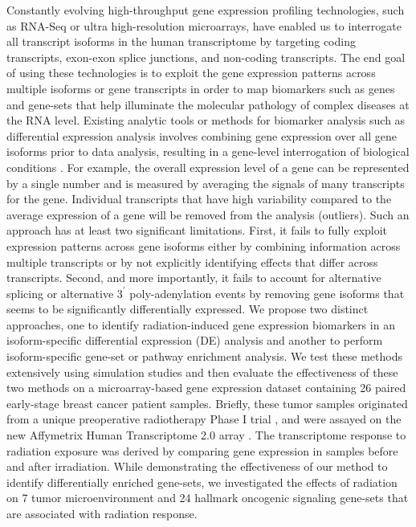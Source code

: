 \documentclass[hidelinks,11pt]{article}
\begin{document}
Constantly evolving high-throughput gene expression profiling technologies, such as RNA-Seq or ultra high-resolution microarrays, have enabled us to interrogate all transcript isoforms in the human transcriptome by targeting coding transcripts, exon-exon splice junctions, and non-coding transcripts. The end goal of using these technologies is to exploit the gene expression patterns across multiple isoforms or gene transcripts in order to map biomarkers such as genes and gene-sets that help illuminate the molecular pathology of complex diseases at the RNA level. Existing analytic tools or methods for biomarker analysis such as differential expression analysis involves combining gene expression over all gene isoforms prior to data analysis, resulting in a gene-level interrogation of biological conditions \cite{collapserows,iri,gsa,gsea,gsva,seqgsea}. For example, the overall expression level of a gene can be represented by a single number and is measured by averaging the signals of many transcripts for the gene. Individual transcripts that have high variability compared to the average expression of a gene will be removed from the analysis (outliers). Such an approach has at least two significant limitations. First, it fails to fully exploit expression patterns across gene isoforms either by combining information across multiple transcripts or by not explicitly identifying effects that differ across transcripts. Second, and more importantly, it fails to account for alternative splicing or alternative $3^\prime$ poly-adenylation events by removing gene isoforms that seems to be significantly differentially expressed. We propose two distinct approaches, one to identify radiation-induced gene expression biomarkers in an isoform-specific differential expression (DE) analysis and another to perform isoform-specific gene-set or pathway enrichment analysis. We test these methods extensively using simulation studies and then evaluate the effectiveness of these two methods on a microarray-based gene expression dataset containing 26 paired early-stage breast cancer patient samples. Briefly, these tumor samples originated from a unique preoperative radiotherapy Phase I trial \cite{fas}, and were assayed on the new Affymetrix Human Transcriptome 2.0 array \cite{affymetrix}. The transcriptome response to radiation exposure was derived by comparing gene expression in samples before and after irradiation. While demonstrating the effectiveness of our method to identify differentially enriched gene-sets, we investigated the effects of radiation on 7 tumor microenvironment and 24 hallmark oncogenic signaling gene-sets that are associated with radiation response.
\end{document}
